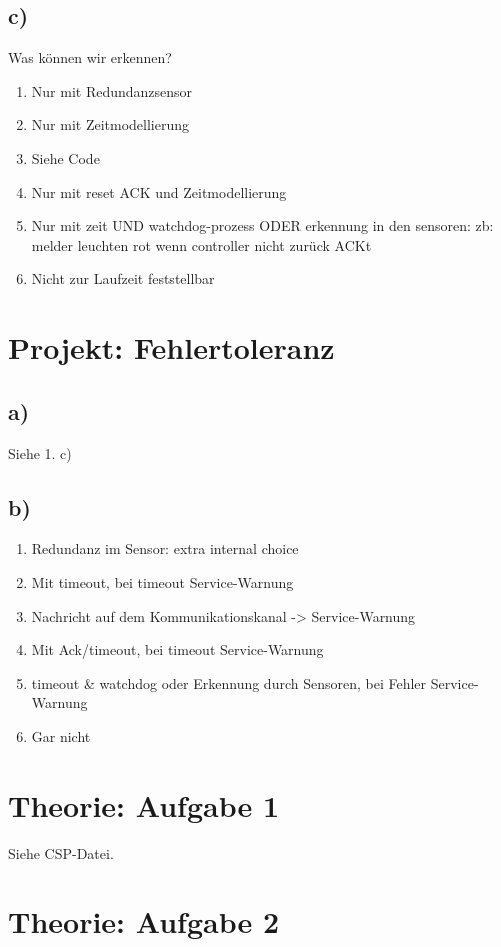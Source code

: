 \documentclass[10pt,a4paper,fleqn]{article}
\begin{document}
  \subsection*{c)}
  Was können wir erkennen?
  \begin{enumerate}[label=\arabic*.]
    \item Nur mit Redundanzsensor
    \item Nur mit Zeitmodellierung
    \item Siehe Code
    \item Nur mit reset ACK und Zeitmodellierung
    \item Nur mit zeit UND watchdog-prozess ODER erkennung in den sensoren: zb: melder leuchten rot wenn controller nicht zurück ACKt
    \item Nicht zur Laufzeit feststellbar
  \end{enumerate}

  \section*{Projekt: Fehlertoleranz}
  \subsection*{a)}
    Siehe 1. c)

  \subsection*{b)}
  \begin{enumerate}[label=\arabic*.]
    \item Redundanz im Sensor: extra internal choice
    \item Mit timeout, bei timeout Service-Warnung
    \item Nachricht auf dem Kommunikationskanal -> Service-Warnung
    \item Mit Ack/timeout, bei timeout Service-Warnung
    \item timeout \& watchdog oder Erkennung durch Sensoren, bei Fehler Service-Warnung
    \item Gar nicht
  \end{enumerate}

  \section*{Theorie: Aufgabe 1}
  Siehe CSP-Datei.

  \section*{Theorie: Aufgabe 2}
\end{document}
